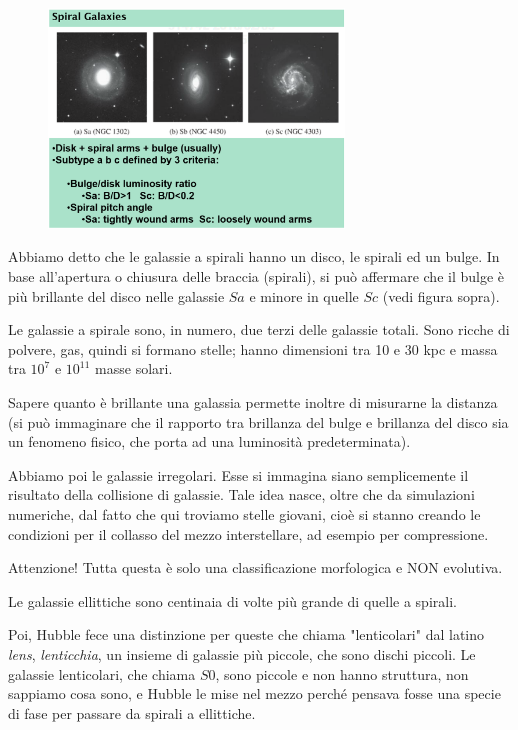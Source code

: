 \begin{figure}[H]
    \centering
    \includegraphics[width=0.7\textwidth]{immagini_lezioni12-12/galassie a spirale sa sb sc.png}
\end{figure}

Abbiamo detto che le galassie a spirali hanno un disco, le spirali ed un bulge. In base all'apertura o chiusura delle braccia (spirali), si può affermare che il bulge è più brillante del disco nelle galassie $Sa$ e minore in quelle $Sc$ (vedi figura sopra).

Le galassie a spirale sono, in numero, due terzi delle galassie totali. Sono ricche di polvere, gas, quindi si formano stelle; hanno dimensioni tra 10 e 30 kpc e massa tra $10^7$ e $10^{11}$ masse solari.

Sapere quanto è brillante una galassia permette inoltre di misurarne la distanza (si può immaginare che il rapporto tra brillanza del bulge e brillanza del disco sia un fenomeno fisico, che porta ad una luminosità predeterminata).

Abbiamo poi le galassie irregolari. Esse si immagina siano semplicemente il risultato della collisione di galassie. Tale idea nasce, oltre che da simulazioni numeriche, dal fatto che qui troviamo stelle giovani, cioè si stanno creando le condizioni per il collasso del mezzo interstellare, ad esempio per compressione.

Attenzione! Tutta questa è solo una classificazione morfologica e NON evolutiva.

Le galassie ellittiche sono centinaia di volte più grande di quelle a spirali.

Poi, Hubble fece una distinzione per queste che chiama "lenticolari" dal latino \textit{lens}, \textit{lenticchia}, un insieme di galassie più piccole, che sono dischi piccoli. Le galassie lenticolari, che chiama $S0$, sono piccole e non hanno struttura, non sappiamo cosa sono, e Hubble le mise nel mezzo perché pensava fosse una specie di fase per passare da spirali a ellittiche.

